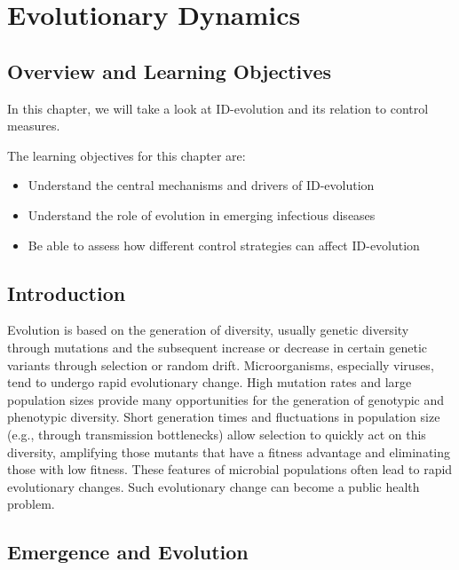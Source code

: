 \documentclass[]{article}
\providecommand{\tightlist}{%
  \setlength{\itemsep}{0pt}\setlength{\parskip}{0pt}}
\theoremstyle{definition}
\theoremstyle{definition}
\theoremstyle{definition}
\theoremstyle{remark}
\begin{document}
\section{Evolutionary Dynamics}\label{evolutionary-dynamics}

\subsection{Overview and Learning
Objectives}\label{overview-and-learning-objectives-12}

In this chapter, we will take a look at ID-evolution and its relation to
control measures.

The learning objectives for this chapter are:

\begin{itemize}
\tightlist
\item
  Understand the central mechanisms and drivers of ID-evolution
\item
  Understand the role of evolution in emerging infectious diseases
\item
  Be able to assess how different control strategies can affect
  ID-evolution
\end{itemize}

\subsection{Introduction}\label{introduction-11}

Evolution is based on the generation of diversity, usually genetic
diversity through mutations and the subsequent increase or decrease in
certain genetic variants through selection or random drift.
Microorganisms, especially viruses, tend to undergo rapid evolutionary
change. High mutation rates and large population sizes provide many
opportunities for the generation of genotypic and phenotypic diversity.
Short generation times and fluctuations in population size (e.g.,
through transmission bottlenecks) allow selection to quickly act on this
diversity, amplifying those mutants that have a fitness advantage and
eliminating those with low fitness. These features of microbial
populations often lead to rapid evolutionary changes. Such evolutionary
change can become a public health problem.

\subsection{Emergence and Evolution}\label{emergence-and-evolution}
\end{document}
